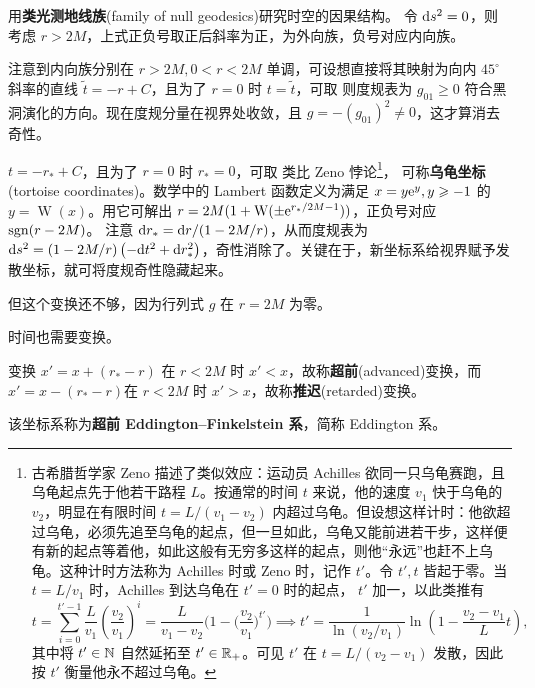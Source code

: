 用\textbf{类光测地线族}(family of null geodesics)研究时空的因果结构。
令 $\dd s^2=0$，则
考虑 $r>2M$，上式正负号取正后斜率为正，为外向族，负号对应内向族。

注意到内向族分别在 $r>2M,0<r<2M$ 单调，可设想直接将其映射为向内 $45^\circ$ 斜率的直线 $\tilde t=-r+C$，且为了 $r=0$ 时 $t=\tilde t$，可取
则度规表为
$g_{01}\geqslant 0$ 符合黑洞演化的方向。现在度规分量在视界处收敛，且 $g=-(g_{01})^2\ne 0$，这才算消去奇性。


$t=-r_*+C$，且为了 $r=0$ 时 $r_*=0$，可取
类比 Zeno 悖论\footnote{古希腊哲学家 Zeno 描述了类似效应：运动员 Achilles 欲同一只乌龟赛跑，且乌龟起点先于他若干路程 $L$。按通常的时间 $t$ 来说，他的速度 $v_1$ 快于乌龟的 $v_2$，明显在有限时间 $t=L/(v_1-v_2)$ 内超过乌龟。但设想这样计时：他欲超过乌龟，必须先追至乌龟的起点，但一旦如此，乌龟又能前进若干步，这样便有新的起点等着他，如此这般有无穷多这样的起点，则他“永远”也赶不上乌龟。这种计时方法称为 Achilles 时或 Zeno 时，记作 $t'$。令 $t',t$ 皆起于零。当 $t=L/v_1$ 时，Achilles 到达乌龟在 $t'=0$ 时的起点， $t'$ 加一，以此类推有
\[t=\sum_{i=0}^{t'-1} \frac{L}{v_1}\left(\frac{v_2}{v_1}\right)^{i}=\frac{L}{v_1-v_2}\bigg(1-\bigg(\frac{v_2}{v_1}\bigg)^{t'}\bigg)\implies t'=\frac{1}{\ln(v_2/v_1)}\ln\left(1-\frac{v_2-v_1}{L}t\right),\]
其中将 $t'\in\mathbb{N}$ 自然延拓至 $t'\in\mathbb{R}_+$。可见 $t'$ 在 $t=L/(v_2-v_1)$ 发散，因此按 $t'$ 衡量他永不超过乌龟。}，
可称\textbf{乌龟坐标}(tortoise coordinates)。数学中的 Lambert 函数定义为满足 $x=y\mathrm{e}^y,y\geqslant -1$ 的$y=\operatorname{W}(x)$。用它可解出 $r=2M(1+\operatorname{W}(\pm\mathrm{e}^{r_*/2M-1}))$，正负号对应 $\operatorname{sgn}(r-2M)$。
注意 $\dd r_*={\dd r}/{(1-2M/r)}$，从而度规表为 $\dd s^2=(1-2M/r)\left(-\dd t^2+\dd r_*^2\right)$，奇性消除了。关键在于，新坐标系给视界赋予发散坐标，就可将度规奇性隐藏起来。

但这个变换还不够，因为行列式 $g$ 在 $r=2M$ 为零。

时间也需要变换。

变换 $x'=x+(r_*-r)$ 在 $r<2M$ 时 $x'<x$，故称\textbf{超前}(advanced)变换，而 $x'=x-(r_*-r)$在 $r<2M$ 时 $x'>x$，故称\textbf{推迟}(retarded)变换。

该坐标系称为\textbf{超前 Eddington–Finkelstein 系}，简称 Eddington 系。



